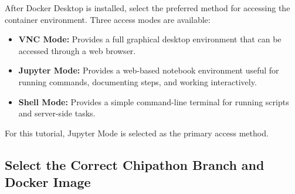 \documentclass[11pt]{article}
\begin{document}
After Docker Desktop is installed, select the preferred method for accessing the container environment. Three access modes are available:

\begin{itemize}
    \item \textbf{VNC Mode:} Provides a full graphical desktop environment that can be accessed through a web browser.

    \item \textbf{Jupyter Mode:} Provides a web-based notebook environment useful for running commands, documenting steps, and working interactively.

    \item \textbf{Shell Mode:} Provides a simple command-line terminal for running scripts and server-side tasks.
\end{itemize}

For this tutorial, Jupyter Mode is selected as the primary access method.

\subsection{Select the Correct Chipathon Branch and Docker Image}
\end{document}
